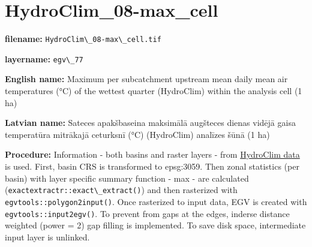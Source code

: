 \documentclass[
]{book}
\newcommand{\passthrough}[1]{#1}
\begin{document}
\section{HydroClim\_08-max\_cell}\label{ch06.077}

\textbf{filename:} \passthrough{\lstinline!HydroClim\_08-max\_cell.tif!}

\textbf{layername:} \passthrough{\lstinline!egv\_77!}

\textbf{English name:} Maximum per subcatchment upstream mean daily mean air temperatures (°C) of the wettest quarter (HydroClim) within the analysis cell (1 ha)

\textbf{Latvian name:} Sateces apakšbaseina maksimālā augšteces dienas vidējā gaisa temperatūra mitrākajā ceturksnī (°C) (HydroClim) analīzes šūnā (1 ha)

\textbf{Procedure:} Information - both basins and raster layers - from \hyperref[Ch04.12]{HydroClim data}
is used. First, basin CRS is transformed to epsg:3059. Then zonal statistics (per basin) with
layer specific summary function - max - are calculated (\passthrough{\lstinline!exactextractr::exact\_extract()!})
and then rasterized with \passthrough{\lstinline!egvtools::polygon2input()!}. Once rasterized to input data,
EGV is created with \passthrough{\lstinline!egvtools::input2egv()!}. To prevent from gaps at the edges,
inderse distance weighted (power = 2) gap filling is implemented. To save disk space,
intermediate input layer is unlinked.
\end{document}
